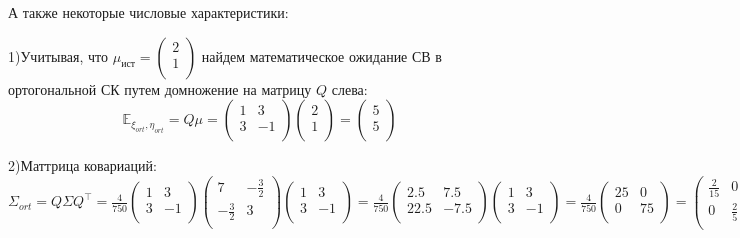 \documentclass{article}
\begin{document}
А также некоторые числовые характеристики:

1)Учитывая, что 
$\mu_{ист}=
\left(
    {\begin{array}{c}
    		2\\
    		1\\
  	\end{array}}
\right)
$
найдем математическое ожидание СВ в ортогональной СК путем домножение на матрицу $Q$ слева:
$$\mathbb{E}_{\xi_{ort},\eta_{ort}}=Q\mu=
\left(
    {\begin{array}{cc}
    		1 & 3\\
    		3 & -1\\
  	\end{array}}
\right)
\left(
    {\begin{array}{c}
    		2\\
    		1\\
  	\end{array}}
\right)=
\left(
    {\begin{array}{c}
    		5\\
    		5\\
  	\end{array}}
\right)$$

2)Маттрица ковариаций:\\
$\Sigma_{ort}=Q\Sigma Q^\top=
\frac{4}{750}
\left(
  	{\begin{array}{cc}
    		1 & 3\\
    		3 & -1\\
  	\end{array}}
\right)
\left(
	{\begin{array}{cc}
    		7 & -\frac{3}{2}\\
     	-\frac{3}{2} & 3\\
  	\end{array}} 
\right)
\left(
  	{\begin{array}{cc}
    		1 & 3\\
    		3 & -1\\
  	\end{array}}
\right)=\frac{4}{750}
\left(
  	{\begin{array}{cc}
    		2.5 & 7.5\\
    		22.5 & -7.5\\
  	\end{array}}
\right)
\left(
  	{\begin{array}{cc}
    		1 & 3\\
    		3 & -1\\
  	\end{array}}
\right)=\frac{4}{750}
\left(
  	{\begin{array}{cc}
    		25 & 0\\
    		0 & 75\\
  	\end{array}}
\right)=
\left(
  	{\begin{array}{cc}
    		\frac{2}{15} & 0\\
    		0 & \frac{2}{5}\\
  	\end{array}}
\right)
$\\
\end{document}

